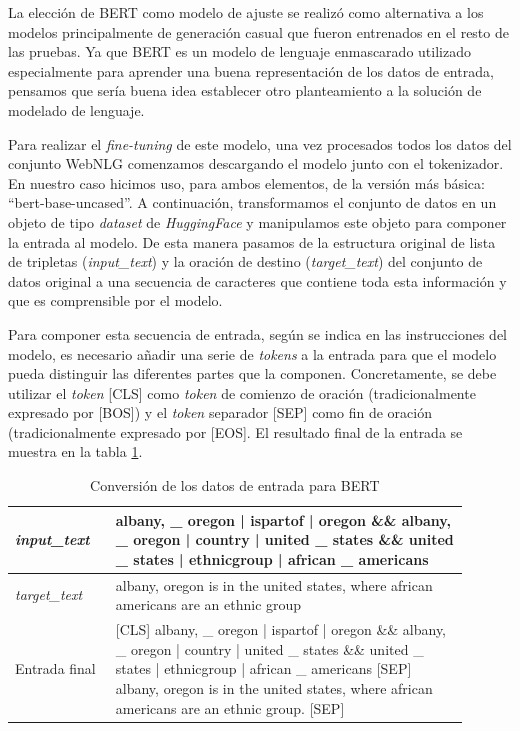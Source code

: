 La elección de BERT como modelo de ajuste se realizó como alternativa a los modelos principalmente de generación casual que fueron entrenados en el resto de las pruebas. Ya que BERT es un modelo de lenguaje enmascarado utilizado especialmente para aprender una buena representación de los datos de entrada, pensamos que sería buena idea establecer otro planteamiento a la solución de modelado de lenguaje.

Para realizar el \textit{fine-tuning} de este modelo, una vez procesados todos los datos del conjunto WebNLG comenzamos descargando el modelo junto con el tokenizador. En nuestro caso hicimos uso, para ambos elementos, de la versión más básica: ``bert-base-uncased''. A continuación, transformamos el conjunto de datos en un objeto de tipo \textit{dataset} de \textit{HuggingFace} y manipulamos este objeto para componer la entrada al modelo. De esta manera pasamos de la estructura original de lista de tripletas (\textit{input\_text}) y la oración de destino (\textit{target\_text}) del conjunto de datos original a una secuencia de caracteres que contiene toda esta información y que es comprensible por el modelo.

Para componer esta secuencia de entrada, según se indica en las instrucciones del modelo, es necesario añadir una serie de \textit{tokens} a la entrada para que el modelo pueda distinguir las diferentes partes que la componen. Concretamente, se debe utilizar el \textit{token} [CLS] como \textit{token} de comienzo de oración (tradicionalmente expresado por [BOS]) y el \textit{token} separador [SEP] como fin de oración (tradicionalmente expresado por [EOS]. El resultado final de la entrada se muestra en la tabla \ref{tab:webnlg_bert}.

\begin{table}[h!]
    \begin{center}
    \begin{tabular}{p{0.2\linewidth} | p{0.7\linewidth}}
    
    \textit{input\_text} & albany, \_ oregon | ispartof | oregon \&\& albany, \_ oregon | country | united \_ states \&\& united \_ states | ethnicgroup | african \_ americans \\ \hline
    \textit{target\_text} & albany, oregon is in the united states, where african americans are an ethnic group \\ \hline
    Entrada final & [CLS] albany, \_ oregon | ispartof | oregon \&\& albany, \_ oregon | country | united \_ states \&\& united \_ states | ethnicgroup | african \_ americans [SEP] albany, oregon is in the united states, where african americans are an ethnic group. [SEP] \\
    
    \end{tabular}
    \caption{Conversión de los datos de entrada para BERT}
    \label{tab:webnlg_bert}
    \end{center}
\end{table}



